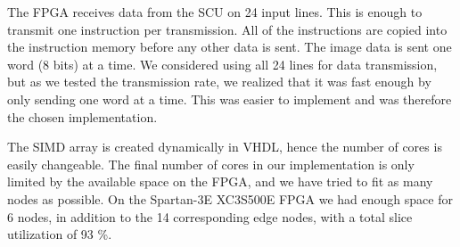 The \ac{FPGA} receives data from the SCU on 24 input lines. This is enough to
transmit one instruction per transmission. All of the instructions are copied
into the instruction memory before any other data is sent. The image data is
sent one word (8 bits) at a time. We considered using all 24 lines for data
transmission, but as we tested the transmission rate, we realized that it was
fast enough by only sending one word at a time. This was easier to
implement and was therefore the chosen implementation.

The \ac{SIMD} array is created dynamically in \ac{VHDL}, hence the
number of cores is easily changeable. The final number of cores in our
implementation is only limited by the available space on the \ac{FPGA},
and we have tried to fit as many nodes as possible. On the Spartan-3E
XC3S500E \ac{FPGA} we had enough space for 6 nodes, in addition to the
14 corresponding edge nodes, with a total slice utilization of 93 \%.
